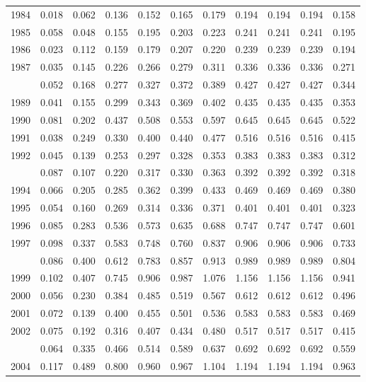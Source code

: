 \documentclass[
]{article}
\begin{document}
\begin{longtable}[t]{lrrrrrrrrrr}
1984 & 0.018 & 0.062 & 0.136 & 0.152 & 0.165 & 0.179 & 0.194 & 0.194 & 0.194 & 0.158\\
1985 & 0.058 & 0.048 & 0.155 & 0.195 & 0.203 & 0.223 & 0.241 & 0.241 & 0.241 & 0.195\\
1986 & 0.023 & 0.112 & 0.159 & 0.179 & 0.207 & 0.220 & 0.239 & 0.239 & 0.239 & 0.194\\
1987 & 0.035 & 0.145 & 0.226 & 0.266 & 0.279 & 0.311 & 0.336 & 0.336 & 0.336 & 0.271\\
\addlinespace
1988 & 0.052 & 0.168 & 0.277 & 0.327 & 0.372 & 0.389 & 0.427 & 0.427 & 0.427 & 0.344\\
1989 & 0.041 & 0.155 & 0.299 & 0.343 & 0.369 & 0.402 & 0.435 & 0.435 & 0.435 & 0.353\\
1990 & 0.081 & 0.202 & 0.437 & 0.508 & 0.553 & 0.597 & 0.645 & 0.645 & 0.645 & 0.522\\
1991 & 0.038 & 0.249 & 0.330 & 0.400 & 0.440 & 0.477 & 0.516 & 0.516 & 0.516 & 0.415\\
1992 & 0.045 & 0.139 & 0.253 & 0.297 & 0.328 & 0.353 & 0.383 & 0.383 & 0.383 & 0.312\\
\addlinespace
1993 & 0.087 & 0.107 & 0.220 & 0.317 & 0.330 & 0.363 & 0.392 & 0.392 & 0.392 & 0.318\\
1994 & 0.066 & 0.205 & 0.285 & 0.362 & 0.399 & 0.433 & 0.469 & 0.469 & 0.469 & 0.380\\
1995 & 0.054 & 0.160 & 0.269 & 0.314 & 0.336 & 0.371 & 0.401 & 0.401 & 0.401 & 0.323\\
1996 & 0.085 & 0.283 & 0.536 & 0.573 & 0.635 & 0.688 & 0.747 & 0.747 & 0.747 & 0.601\\
1997 & 0.098 & 0.337 & 0.583 & 0.748 & 0.760 & 0.837 & 0.906 & 0.906 & 0.906 & 0.733\\
\addlinespace
1998 & 0.086 & 0.400 & 0.612 & 0.783 & 0.857 & 0.913 & 0.989 & 0.989 & 0.989 & 0.804\\
1999 & 0.102 & 0.407 & 0.745 & 0.906 & 0.987 & 1.076 & 1.156 & 1.156 & 1.156 & 0.941\\
2000 & 0.056 & 0.230 & 0.384 & 0.485 & 0.519 & 0.567 & 0.612 & 0.612 & 0.612 & 0.496\\
2001 & 0.072 & 0.139 & 0.400 & 0.455 & 0.501 & 0.536 & 0.583 & 0.583 & 0.583 & 0.469\\
2002 & 0.075 & 0.192 & 0.316 & 0.407 & 0.434 & 0.480 & 0.517 & 0.517 & 0.517 & 0.415\\
\addlinespace
2003 & 0.064 & 0.335 & 0.466 & 0.514 & 0.589 & 0.637 & 0.692 & 0.692 & 0.692 & 0.559\\
2004 & 0.117 & 0.489 & 0.800 & 0.960 & 0.967 & 1.104 & 1.194 & 1.194 & 1.194 & 0.963\\

\end{longtable}
\end{document}
